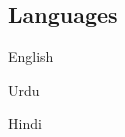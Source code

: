 \documentclass[]{deedy-resume-openfont}
\begin{document}
\begin{minipage}[t]{0.33\textwidth}
    \subsection{Languages}
    \vspace{\topsep}
    \begin{tightemize}
        \item English
        \item Urdu
        \item Hindi
    \end{tightemize}



\end{minipage}
\hfill
\end{document}
